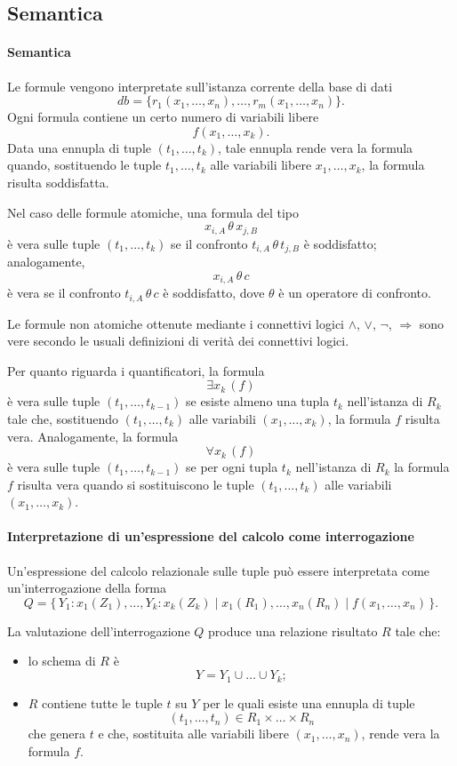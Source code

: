 \subsection{Semantica}
\paragraph{Semantica}
Le formule vengono interpretate sull’istanza corrente della base di dati
\[
\mathit{db} = \{ r_1(x_1,\dots,x_n), \dots, r_m(x_1,\dots,x_n) \}.
\]
Ogni formula contiene un certo numero di variabili libere
\[
f(x_1,\dots,x_k).
\]
Data una ennupla di tuple $(t_1,\dots,t_k)$, tale ennupla rende vera la formula
quando, sostituendo le tuple $t_1,\dots,t_k$ alle variabili libere
$x_1,\dots,x_k$, la formula risulta soddisfatta.

Nel caso delle formule atomiche, una formula del tipo
\[
x_{i,A} \,\theta\, x_{j,B}
\]
è vera sulle tuple $(t_1,\dots,t_k)$ se il confronto
$t_{i,A} \,\theta\, t_{j,B}$ è soddisfatto; analogamente,
\[
x_{i,A} \,\theta\, c
\]
è vera se il confronto $t_{i,A} \,\theta\, c$ è soddisfatto, dove $\theta$ è un
operatore di confronto.

Le formule non atomiche ottenute mediante i connettivi logici
$\wedge$, $\vee$, $\neg$, $\Rightarrow$ sono vere secondo le usuali definizioni
di verità dei connettivi logici.

Per quanto riguarda i quantificatori, la formula
\[
\exists x_k\, (f)
\]
è vera sulle tuple $(t_1,\dots,t_{k-1})$ se esiste almeno una tupla $t_k$
nell’istanza di $R_k$ tale che, sostituendo $(t_1,\dots,t_k)$ alle variabili
$(x_1,\dots,x_k)$, la formula $f$ risulta vera.
Analogamente, la formula
\[
\forall x_k\, (f)
\]
è vera sulle tuple $(t_1,\dots,t_{k-1})$ se per ogni tupla $t_k$ nell’istanza di
$R_k$ la formula $f$ risulta vera quando si sostituiscono le tuple
$(t_1,\dots,t_k)$ alle variabili $(x_1,\dots,x_k)$.
\paragraph{Interpretazione di un’espressione del calcolo come interrogazione}
Un’espressione del calcolo relazionale sulle tuple può essere interpretata come
un’interrogazione della forma
\[
Q = \{\, Y_1 : x_1(Z_1), \dots, Y_k : x_k(Z_k)
\mid x_1(R_1), \dots, x_n(R_n) \mid f(x_1,\dots,x_n) \,\}.
\]

La valutazione dell’interrogazione $Q$ produce una relazione risultato $R$ tale che:
\begin{itemize}
	\item lo schema di $R$ è
	\[
	Y = Y_1 \cup \dots \cup Y_k;
	\]
	\item $R$ contiene tutte le tuple $t$ su $Y$ per le quali esiste una ennupla di
	tuple
	\[
	(t_1,\dots,t_n) \in R_1 \times \dots \times R_n
	\]
	che genera $t$ e che, sostituita alle variabili libere
	$(x_1,\dots,x_n)$, rende vera la formula $f$.
\end{itemize}
